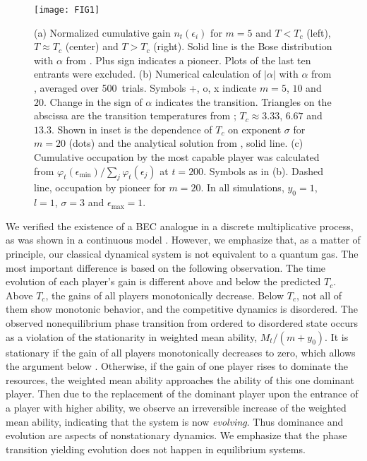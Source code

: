 \documentclass[amsmath,amssymb,floatf
ix]{revtex4}
\begin{document}
\begin{figure}[t]
\texttt{[image: FIG1]}
\caption{\label{PT}
(a) Normalized cumulative gain $n_t(\epsilon_i)$
for $m = 5$ and $T<T_c$ (left), $T \approx T_c$ (center) and $T>T_c$
(right). Solid line is the Bose distribution with $\alpha $ from
. Plus sign indicates a pioneer. Plots of the last ten
entrants were excluded. (b) Numerical calculation of $|\alpha|$ with
$\alpha$ from , averaged over 500~trials. Symbols +, o, x
indicate $m = 5$, $10$ and $20$.  Change in the sign of $\alpha$
indicates the transition. Triangles on the abscissa are the transition
temperatures from ; $T_c \approx 3.33 $, $6.67 $ and $13.3
$. Shown in inset is the dependence of $T_c$ on exponent $\sigma $ for
$m = 20$ (dots) and the analytical solution from , solid
line. (c) Cumulative occupation by the most capable player was
calculated from $ \varphi_t (\epsilon _{\min}) / \sum\nolimits_j
\varphi_t (\epsilon _j) $ at
$t = 200$. Symbols as in (b). Dashed line, occupation by pioneer for $m =
20$. In all simulations, $y_0 = 1 $, $l = 1$, $\sigma = 3$ and $\epsilon
_{\max } = 1$.}
\end{figure}

We verified the existence of a BEC analogue in a discrete
multiplicative process, as was shown in a continuous model
\cite{Bianconi01}. However, we emphasize that, as a matter of
principle, our classical dynamical system is not equivalent to a
quantum gas. The most important difference is based on the following
observation. The time evolution of each player's gain
is different above and below the predicted $T_c$. Above $T_c$, the
gains of all players monotonically decrease.
Below $T_c$, not all of them show monotonic behavior, and the
competitive dynamics is disordered.  The
observed nonequilibrium phase transition from ordered to disordered
state occurs as a violation of the stationarity in weighted mean
ability, $M_t/(m+y_0)$.  It is stationary if the
gain of all players monotonically decreases to zero, which allows the
argument below . Otherwise, if the gain of one player rises
to dominate the resources, the weighted mean ability approaches the
ability of this one dominant player.  Then due to the replacement of
the dominant player upon the entrance of a player with higher ability,
we observe an irreversible increase of the weighted mean ability,
indicating that the system is now \textit{evolving}. Thus dominance
and evolution are aspects of nonstationary dynamics. We emphasize that
the phase transition yielding evolution does not happen in
equilibrium systems.
\end{document}
